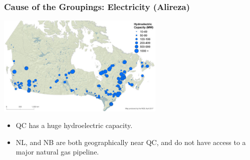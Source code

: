 \documentclass{beamer}
\begin{document}
\begin{frame}
\frametitle{Cause of the Groupings: Electricity (Alireza)}
\begin{center}
\includegraphics[width=0.6\textwidth]{hydroPower.jpg}
\small
\end{center}
\begin{itemize}
	\item QC has a huge hydroelectric capacity. 
	\item  NL, and NB are both geographically near QC, and do not have access to a major natural gas pipeline.  
\end{itemize}
\normalsize
\end{frame}
\end{document}
